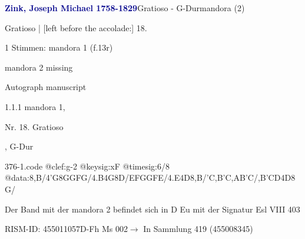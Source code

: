 \documentclass[twocolumn, 12pt]{book}
\begin{document}
\par \vspace{16pt} \textcolor{darkblue}{\textbf{Zink, Joseph Michael  1758-1829}}\hfillplus{\textbf{[376]}}\newline Gratioso - G-Dur\newline mandora (2)
\par \begin{itshape}[f.13r, at left:] Gratioso | [left before the accolade:] 18.\end{itshape} 
\par \textcolor{darkblue}{}  1 Stimmen: mandora 1  (f.13r)\newline \begin{small} mandora 2 missing\end{small} \newline Autograph manuscript
\par 1.1.1  mandora 1, \begin{itshape}Nr. 18. Gratioso\end{itshape}, G-Dur  
\begin{filecontents*}{376-1.code}
@clef:g-2
@keysig:xF
@timesig:6/8
@data:8,B/4'G8GGFG/4.B4G8D/{EF}GGFE/4.E4D8,B/'C,B'C,AB'C/{,B'C}D4D8G/
\end{filecontents*}
\newline %
\par Der Band mit der mandora 2 befindet sich in D Eu mit der Signatur Esl VIII 403
\par RISM-ID: 455011057\newline D-Fh  Ms 002\newline $\rightarrow$ In Sammlung 419 (455008345)
      
\end{document}

